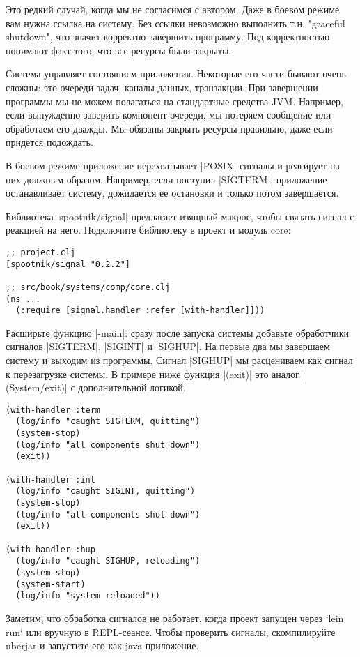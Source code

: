 Это редкий случай, когда мы не согласимся с автором. Даже в боевом режиме вам
нужна ссылка на систему. Без ссылки невозможно выполнить т.н. "graceful
shutdown", что значит корректно завершить программу. Под корректностью понимают
факт того, что все ресурсы были закрыты.

Система управляет состоянием приложения. Некоторые его части бывают очень
сложны: это очереди задач, каналы данных, транзакции. При завершении программы
мы не можем полагаться на стандартные средства JVM. Например, если вынужденно
заверить компонент очереди, мы потеряем сообщение или обработаем его дважды. Мы
обязаны закрыть ресурсы правильно, даже если придется подождать.

В боевом режиме приложение перехватывает \spverb|POSIX|-сигналы и реагирует на них
должным образом. Например, если поступил \spverb|SIGTERM|, приложение останавливает
систему, дожидается ее остановки и только потом завершается.

Библиотека \spverb|spootnik/signal| предлагает изящный макрос, чтобы связать сигнал с
реакцией на него. Подключите библиотеку в проект и модуль core:

\begin{verbatim}
;; project.clj
[spootnik/signal "0.2.2"]

;; src/book/systems/comp/core.clj
(ns ...
  (:require [signal.handler :refer [with-handler]]))
\end{verbatim}

Расширьте функцию \spverb|-main|: сразу после запуска системы добавьте обработчики
сигналов \spverb|SIGTERM|, \spverb|SIGINT| и \spverb|SIGHUP|. На первые два мы завершаем систему и
выходим из программы. Сигнал \spverb|SIGHUP| мы расцениваем как сигнал к перезагрузке
системы. В примере ниже функция \spverb|(exit)| это аналог \spverb|(System/exit)| с
дополнительной логикой.

\begin{verbatim}
(with-handler :term
  (log/info "caught SIGTERM, quitting")
  (system-stop)
  (log/info "all components shut down")
  (exit))

(with-handler :int
  (log/info "caught SIGINT, quitting")
  (system-stop)
  (log/info "all components shut down")
  (exit))

(with-handler :hup
  (log/info "caught SIGHUP, reloading")
  (system-stop)
  (system-start)
  (log/info "system reloaded"))
\end{verbatim}

Заметим, что обработка сигналов не работает, когда проект запущен через `lein
run` или вручную в REPL-сеансе. Чтобы проверить сигналы, скомпилируйте uberjar и
запустите его как java-приложение.

